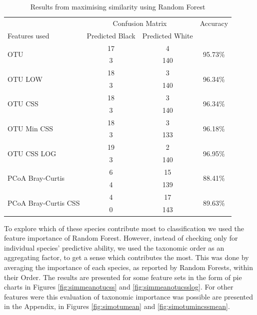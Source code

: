 \begin{table}[!htb]
	\centering
	\caption{Results from maximising similarity using Random Forest}
	\label{table:rfrsimilarity}
\begin{tabular}{l c  c c}
	\toprule
	&\multicolumn{2}{c}{Confusion Matrix} & Accuracy\\
	Features used & Predicted Black&Predicted White&\\
	
	\midrule
	\multirow{2}{*}{OTU} &17 &4&\multirow{2}{*}{95.73\%}\\
	&	 3&140&\\
	\cmidrule{2-3}
	\multirow{2}{*}{OTU LOW} &18 &3&\multirow{2}{*}{96.34\%}\\
	&	 3&140&\\
	\cmidrule{2-3}
	\multirow{2}{*}{OTU CSS} &18 &3&\multirow{2}{*}{96.34\%}\\
	&	 3&140&\\
	\cmidrule{2-3}
	\multirow{2}{*}{OTU Min CSS}&18 &3&\multirow{2}{*}{96.18\%}\\
	&	 3&133&\\
	\cmidrule{2-3}
	\multirow{2}{*}{OTU CSS LOG} &19 &2&\multirow{2}{*}{96.95\%}\\
	&	 3&140&\\
	\cmidrule{2-3}
	\multirow{2}{*}{PCoA Bray-Curtis} &6 &15&\multirow{2}{*}{88.41\%}\\
	&	 4&139&\\
	\cmidrule{2-3}
	\multirow{2}{*}{PCoA Bray-Curtis CSS} &4 &17&\multirow{2}{*}{89.63\%}\\
	&	 0&143&\\
	\bottomrule
\end{tabular}

\end{table}

To explore which of these species contribute most to classification we used the feature importance of Random Forest. However, instead of checking only for individual species' predictive ability, we used the taxonomic order as an aggregating factor, to get a sense which contributes the most. This was done by averaging the importance of each species, as reported by Random Forests, within their Order. The results are presented for some feature sets in the form of pie charts in Figures \ref{fig:simmeanotucss} and \ref{fig:simmeanotucsslog}. For other features were this evaluation of taxonomic importance was possible are presented in the Appendix, in Figures \ref{fig:simotumean} and \ref{fig:simotumincssmean}. 

